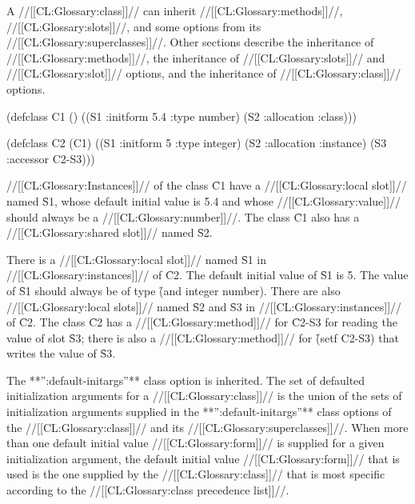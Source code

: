 \endsubSection%

 
                                               A //[[CL:Glossary:class]]// can inherit //[[CL:Glossary:methods]]//, //[[CL:Glossary:slots]]//,  and some  options from its //[[CL:Glossary:superclasses]]//.   Other sections describe the inheritance of //[[CL:Glossary:methods]]//,  the inheritance of //[[CL:Glossary:slots]]// and //[[CL:Glossary:slot]]// options,  and the inheritance of //[[CL:Glossary:class]]// options.
 


\code
 (defclass C1 () 
     ((S1 :initform 5.4 :type number) 
      (S2 :allocation :class)))
 
 (defclass C2 (C1) 
     ((S1 :initform 5 :type integer)
      (S2 :allocation :instance)
      (S3 :accessor C2-S3))) \endcode

//[[CL:Glossary:Instances]]// of the class \f{C1} have a //[[CL:Glossary:local slot]]// named \f{S1}, whose default initial value is 5.4 and whose //[[CL:Glossary:value]]// should always be a //[[CL:Glossary:number]]//. The class \f{C1} also has a //[[CL:Glossary:shared slot]]// named \f{S2}.

There is a //[[CL:Glossary:local slot]]// named \f{S1} in //[[CL:Glossary:instances]]// of \f{C2}. The default initial value of \f{S1} is 5. The value of \f{S1} should always be of type \f{(and integer number)}. There are also //[[CL:Glossary:local slots]]// named \f{S2} and \f{S3} in //[[CL:Glossary:instances]]// of \f{C2}. The class \f{C2} has a //[[CL:Glossary:method]]// for \f{C2-S3} for reading the value of slot \f{S3}; there is also a //[[CL:Glossary:method]]// for \f{(setf C2-S3)} that writes the value of \f{S3}.

\endsubsubsection%

      The **'':default-initargs''** class option is inherited.  The set of defaulted initialization arguments for a //[[CL:Glossary:class]]// is the union of the sets of initialization arguments supplied in the **'':default-initargs''** class options of the //[[CL:Glossary:class]]// and its //[[CL:Glossary:superclasses]]//. When more than one default initial value //[[CL:Glossary:form]]// is supplied for a given initialization argument, the default initial value //[[CL:Glossary:form]]// that is used is the one supplied by the //[[CL:Glossary:class]]// that is most specific according to the //[[CL:Glossary:class precedence list]]//.

